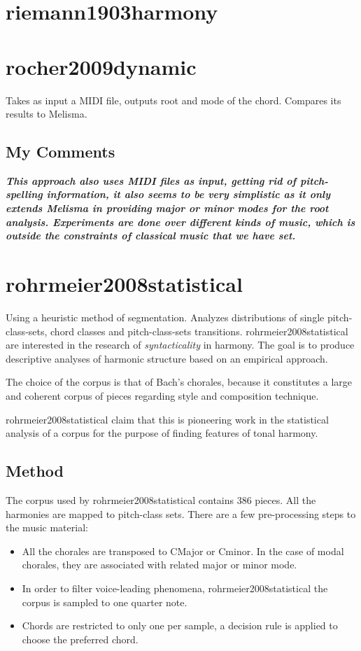 	\section{riemann1903harmony }
	\section{rocher2009dynamic }
		Takes as input a MIDI file, outputs root and mode of the chord. Compares its results to Melisma.
		\subsection{My Comments}
			\emph{\textbf{
				This approach also uses MIDI files as input, getting rid of pitch-spelling information, it also seems to be very simplistic as it only extends Melisma in providing major or minor modes for the root analysis. Experiments are done over different kinds of music, which is outside the constraints of classical music that we have set.
			}}
	\section{rohrmeier2008statistical }
		Using a heuristic method of segmentation. Analyzes distributions of single pitch-class-sets, chord classes and pitch-class-sets transitions. rohrmeier2008statistical are interested in the research of \emph{syntacticality} in harmony. The goal is to produce descriptive analyses of harmonic structure based on an empirical approach.

		The choice of the corpus is that of Bach's chorales, because it constitutes a large and coherent corpus of pieces regarding style and composition technique.

		rohrmeier2008statistical claim that this is pioneering work in the statistical analysis of a corpus for the purpose of finding features of tonal harmony.

		\subsection{Method}
			The corpus used by rohrmeier2008statistical contains 386 pieces. All the harmonies are mapped to pitch-class sets.
			There are a few pre-processing steps to the music material:
			\begin{itemize}
				\item All the chorales are transposed to CMajor or Cminor. In the case of modal chorales, they are associated with related major or minor mode.
				\item In order to filter voice-leading phenomena, rohrmeier2008statistical the corpus is sampled to one quarter note.
				\item Chords are restricted to only one per sample, a decision rule is applied to choose the preferred chord.
			\end{itemize}

